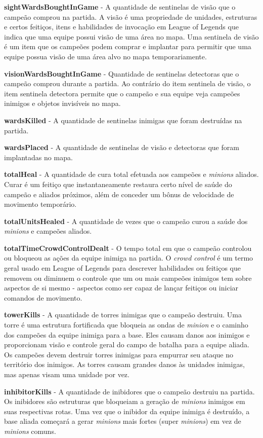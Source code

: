 \textbf{sightWardsBoughtInGame} - A quantidade de sentinelas de visão que o campeão comprou na partida. A visão é uma propriedade de unidades, estruturas e certos feitiços, itens e habilidades de invocação em League of Legends que indica que uma equipe possui visão de uma área no mapa. Uma sentinela de visão é um item que os campeões podem comprar e implantar para permitir que uma equipe possua visão de uma área alvo no mapa temporariamente.

\textbf{visionWardsBoughtInGame} - Quantidade de sentinelas detectoras que o campeão comprou durante a partida. Ao contrário do item sentinela de visão, o item sentinela detectora permite que o campeão e sua equipe veja campeões inimigos e objetos invisíveis no mapa.

\textbf{wardsKilled} - A quantidade de sentinelas inimigas que foram destruídas na partida.

\textbf{wardsPlaced} - A quantidade de sentinelas de visão e detectoras que foram implantadas no mapa.

\textbf{totalHeal} - A quantidade de cura total efetuada aos campeões e \textit{minions} aliados. Curar é um feitiço que instantaneamente restaura certo nível de saúde do campeão e aliados próximos, além de conceder um bônus de velocidade de movimento temporário.

\textbf{totalUnitsHealed} - A quantidade de vezes que o campeão curou a saúde dos \textit{minions} e campeões aliados.

\textbf{totalTimeCrowdControlDealt} - O tempo total em que o campeão controlou ou bloqueou as ações da equipe inimiga na partida. O \textit{crowd control} é um termo geral usado em League of Legends para descrever habilidades ou feitiços que removem ou diminuem o controle que um ou mais campeões inimigos tem sobre aspectos de si mesmo - aspectos como ser capaz de lançar feitiços ou iniciar comandos de movimento.

\textbf{towerKills} - A quantidade de torres inimigas que o campeão destruiu. Uma torre é uma estrutura fortificada que bloqueia as ondas de \textit{minion} e o caminho dos campeões da equipe inimiga para a base. Eles causam danos aos inimigos e proporcionam visão e controle geral do campo de batalha para a equipe aliada. Os campeões devem destruir torres inimigas para empurrar seu ataque no território dos inimigos. As torres causam grandes danos às unidades inimigas, mas apenas visam uma unidade por vez.

\textbf{inhibitorKills} - A quantidade de inibidores que o campeão destruiu na partida. Os inibidores são estruturas que bloqueiam a geração de \textit{minions} inimigos em suas respectivas rotas. Uma vez que o inibidor da equipe inimiga é destruído, a base aliada começará a gerar \textit{minions} mais fortes (super \textit{minions}) em vez de \textit{minions} comuns.


